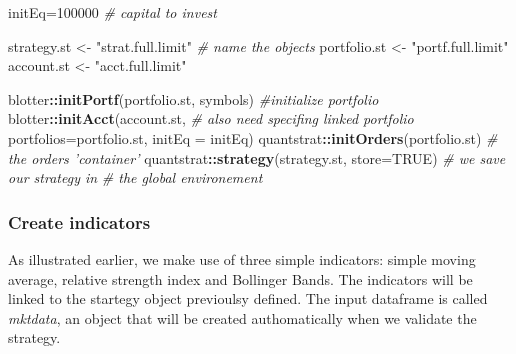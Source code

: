 \documentclass[
  11pt,
]{article}
\newenvironment{Shaded}{\begin{snugshade}}{\end{snugshade}}
\newcommand{\CommentTok}[1]{\textcolor[rgb]{0.56,0.35,0.01}{\textit{#1}}}
\newcommand{\DataTypeTok}[1]{\textcolor[rgb]{0.13,0.29,0.53}{#1}}
\newcommand{\DecValTok}[1]{\textcolor[rgb]{0.00,0.00,0.81}{#1}}
\newcommand{\KeywordTok}[1]{\textcolor[rgb]{0.13,0.29,0.53}{\textbf{#1}}}
\newcommand{\NormalTok}[1]{#1}
\newcommand{\OperatorTok}[1]{\textcolor[rgb]{0.81,0.36,0.00}{\textbf{#1}}}
\newcommand{\OtherTok}[1]{\textcolor[rgb]{0.56,0.35,0.01}{#1}}
\newcommand{\StringTok}[1]{\textcolor[rgb]{0.31,0.60,0.02}{#1}}
\begin{document}
\begin{Shaded}
\begin{Highlighting}[]
\NormalTok{initEq=}\DecValTok{100000} \CommentTok{# capital to invest}

\NormalTok{strategy.st <-}\StringTok{ "strat.full.limit"} \CommentTok{# name the objects}
\NormalTok{portfolio.st <-}\StringTok{ "portf.full.limit"}
\NormalTok{account.st <-}\StringTok{ "acct.full.limit"}

\NormalTok{blotter}\OperatorTok{::}\KeywordTok{initPortf}\NormalTok{(portfolio.st, symbols) }\CommentTok{#initialize portfolio}
\NormalTok{blotter}\OperatorTok{::}\KeywordTok{initAcct}\NormalTok{(account.st, }\CommentTok{# also need specifing linked portfolio }
         \DataTypeTok{portfolios=}\NormalTok{portfolio.st, }
         \DataTypeTok{initEq =}\NormalTok{ initEq) }
\NormalTok{quantstrat}\OperatorTok{::}\KeywordTok{initOrders}\NormalTok{(portfolio.st) }\CommentTok{# the orders 'container'}
\NormalTok{quantstrat}\OperatorTok{::}\KeywordTok{strategy}\NormalTok{(strategy.st, }\DataTypeTok{store=}\OtherTok{TRUE}\NormalTok{) }\CommentTok{# we save our strategy in }
\CommentTok{# the global environement}
\end{Highlighting}
\end{Shaded}

\hypertarget{create-indicators}{%
\subsubsection{Create indicators}\label{create-indicators}}

As illustrated earlier, we make use of three simple indicators: simple
moving average, relative strength index and Bollinger Bands. The
indicators will be linked to the startegy object previoulsy defined. The
input dataframe is called \emph{mktdata}, an object that will be created
authomatically when we validate the strategy.
\end{document}
